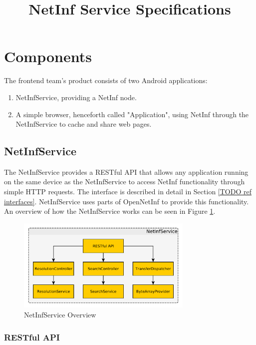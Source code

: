\documentclass[10pt,a4paper]{article}
\title{NetInf Service Specifications}
\begin{document}
\maketitle

\section{Components}

The frontend team's product consists of two Android applications:
\begin{enumerate}
\item NetInfService, providing a NetInf node.
\item A simple browser, henceforth called "Application", using NetInf through the NetInfService to cache and share web pages.
\end{enumerate}

\subsection{NetInfService}

The NetInfService provides a RESTful API that allows any application running on the same device as the NetInfService to access NetInf functionality through simple HTTP requests. The interface is described in detail in Section \ref{TODO ref interfaces}. NetInfService uses parts of OpenNetInf to provide this functionality. An overview of how the NetInfService works can be seen in Figure \ref{fig:netinfserviceoverview}.

\begin{figure}[h!]
	\centering
		\includegraphics[width=0.75\textwidth]{netinfservice}
    	\caption{NetInfService Overview}
	\label{fig:netinfserviceoverview}
\end{figure}

\subsubsection{RESTful API}
\end{document}
